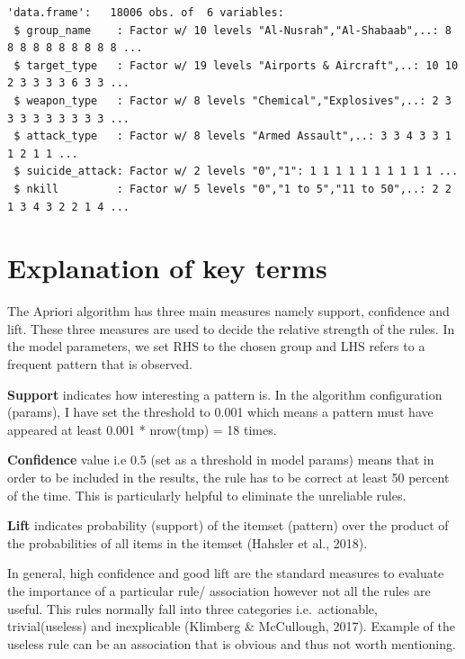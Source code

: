 \documentclass[11pt,oneside,a4paper]{reedthesis}
\newenvironment{Shaded}{\begin{snugshade}}{\end{snugshade}}
\newcommand{\KeywordTok}[1]{\textcolor[rgb]{0.13,0.29,0.53}{\textbf{#1}}}
\newcommand{\StringTok}[1]{\textcolor[rgb]{0.31,0.60,0.02}{#1}}
\newcommand{\CommentTok}[1]{\textcolor[rgb]{0.56,0.35,0.01}{\textit{#1}}}
\newcommand{\NormalTok}[1]{#1}
\begin{document}
\begin{Shaded}
\begin{Highlighting}[]
{{{\CommentTok{#convert everything to factor}
\NormalTok{tmp[] <-}\StringTok{ }\KeywordTok{lapply}\NormalTok{(tmp, factor)}
\KeywordTok{str}\NormalTok{(tmp)}
\end{Highlighting}
\end{Shaded}
\begin{verbatim}
'data.frame':   18006 obs. of  6 variables:
 $ group_name    : Factor w/ 10 levels "Al-Nusrah","Al-Shabaab",..: 8 8 8 8 8 8 8 8 8 8 ...
 $ target_type   : Factor w/ 19 levels "Airports & Aircraft",..: 10 10 2 3 3 3 3 6 3 3 ...
 $ weapon_type   : Factor w/ 8 levels "Chemical","Explosives",..: 2 3 3 3 3 3 3 3 3 3 ...
 $ attack_type   : Factor w/ 8 levels "Armed Assault",..: 3 3 4 3 3 1 1 2 1 1 ...
 $ suicide_attack: Factor w/ 2 levels "0","1": 1 1 1 1 1 1 1 1 1 1 ...
 $ nkill         : Factor w/ 5 levels "0","1 to 5","11 to 50",..: 2 2 1 3 4 3 2 2 1 4 ...
\end{verbatim}
\section{Explanation of key terms}\label{explanation-of-key-terms}

The Apriori algorithm has three main measures namely support, confidence
and lift. These three measures are used to decide the relative strength
of the rules. In the model parameters, we set RHS to the chosen group
and LHS refers to a frequent pattern that is observed.

\textbf{Support} indicates how interesting a pattern is. In the
algorithm configuration (params), I have set the threshold to 0.001
which means a pattern must have appeared at least 0.001 * nrow(tmp) = 18
times.

\textbf{Confidence} value i.e 0.5 (set as a threshold in model params)
means that in order to be included in the results, the rule has to be
correct at least 50 percent of the time. This is particularly helpful to
eliminate the unreliable rules.

\textbf{Lift} indicates probability (support) of the itemset (pattern)
over the product of the probabilities of all items in the itemset
(Hahsler et al., 2018).

In general, high confidence and good lift are the standard measures to
evaluate the importance of a particular rule/ association however not
all the rules are useful. This rules normally fall into three categories
i.e.~actionable, trivial(useless) and inexplicable (Klimberg \&
McCullough, 2017). Example of the useless rule can be an association
that is obvious and thus not worth mentioning.
\end{document}

